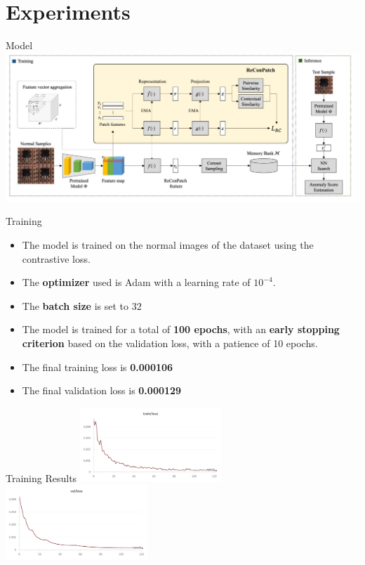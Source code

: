 \documentclass{beamer}
\begin{document}
\section{Experiments}
\begin{frame}{Model}
\includegraphics[width=\textwidth]
{assets/model}
\end{frame}
\begin{frame}{Training}
      \begin{itemize}
              \item The model is trained on the normal images of the dataset 
              using the contrastive loss.
              \item The \textbf{optimizer} used is Adam with a learning rate of $10^{-4}$.
              \item The \textbf{batch size} is set to $32$
              \item The model is trained for a total of \textbf{100 epochs}, with an \textbf{early stopping
               criterion} based on the validation loss, with a patience of 10 epochs.
              \item The final training loss is \textbf{0.000106}
              \item The final validation loss is \textbf{0.000129}
              \end{itemize}
              
\end{frame}

\begin{frame}{Training Results}
    \centering
    \includegraphics[width=0.40\textwidth]{assets/train_loss.png}
    \hspace{0.04\textwidth}
    \includegraphics[width=0.40\textwidth]{assets/val_loss.png}
\end{frame}
\end{document}
